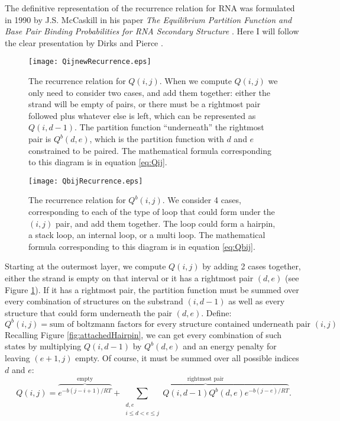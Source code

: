 The definitive representation of the recurrence relation for RNA was
formulated in 1990 by J.S. McCaskill in his paper \emph{The
  Equilibrium Partition Function and Base Pair Binding Probabilities
  for RNA Secondary Structure} \cite{mccaskill1990equilibrium}. Here I
will follow the clear presentation by Dirks and Pierce
\cite{dirks2003partition}.

\begin{figure}[t]
\centering
\texttt{[image: QijnewRecurrence.eps]}
\caption{The recurrence relation for $Q(i,j)$. When we compute
  $Q(i,j)$ we only need to consider two cases, and add them together:
  either the strand will be empty of pairs, or there must be a
  rightmost pair followed plus whatever else is left, which can be
  represented as $Q(i, d-1)$. The partition function ``underneath''
  the rightmost pair is $Q^b(d, e)$, which is the partition function
  with $d$ and $e$ constrained to be paired. The mathematical formula
  corresponding to this diagram is in equation \ref{eq:Qij}.}
\label{fig:recurrenceRelationsQij}
\end{figure}
\begin{figure}[t]
\centering
\texttt{[image: QbijRecurrence.eps]}
\caption{The recurrence relation for $Q^b(i,j)$. We consider 4 cases,
  corresponding to each of the type of loop that could form under the
  $(i,j)$ pair, and add them together. The loop could form a hairpin,
  a stack loop, an internal loop, or a multi loop. The mathematical
  formula corresponding to this diagram is in equation \ref{eq:Qbij}.}
\label{fig:recurrenceRelationsQbij}
\end{figure}

Starting at the outermost layer, we compute $Q(i,j)$ by adding 2 cases
together, either the strand is empty on that interval or it has a
rightmost pair $(d,e)$ (see Figure
\ref{fig:recurrenceRelationsQij}). If it has a rightmost pair, the
partition function must be summed over every combination of structures
on the substrand $(i, d-1)$ as well as every structure that could form
underneath the pair $(d,e)$. Define:
\begin{equation}
Q^b(i, j) = \text{sum of boltzmann factors for every structure contained underneath pair } (i,j)
\end{equation}
Recalling Figure \ref{fig:attachedHairpin}, we can get every combination
of such states by multiplying $Q(i, d-1)$ by $Q^b(d,e)$ and an energy
penalty for leaving $(e+1, j)$ empty. Of course, it must be summed
over all possible indices $d$ and $e$:
\begin{equation} 
Q(i,j) = \overbrace{e^{-b(j-i+1)/RT}}^{\text{empty}} + \overbrace{\sum_{\substack{ d,e \\ i \leq d < e \leq j}}Q(i, d - 1) Q^b(d, e) e^{-b(j-e)/RT}}^{\text{rightmost pair}}. 
\label{eq:Qij}
\end{equation}

